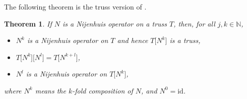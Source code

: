 \documentclass[10pt,a4paper]{amsart}
\numberwithin{equation}{section}
\newtheorem{Theorem}{Theorem}[section]
\newcommand{\N}{\mathbb N}
\newcommand{\id}{\mathrm{id}}
\begin{document}
The following theorem is the truss version of \cite[Theorem~2]{4}.

\begin{Theorem}\label{thm.Nij.iter}
If $N$ is a Nijenhuis operator on a truss $T$, then, for all $j,k\in \N$,
\begin{itemize}\itemsep=0pt
\item[$(a)$] $N^k$ is a Nijenhuis operator on $T$ and hence $T\big[N^k\big]$ is a truss,
\item[$(b)$] $T\big[N^k\big]\big[N^l\big] = T\big[N^{k+l}\big]$,
\item[$(c)$] $N^l$ is a Nijenhuis operator on $T\big[N^k\big]$,
\end{itemize}
where $N^k$ means the $k$-fold composition of $N$, and $N^0=\id$.
\end{Theorem}
\end{document}

